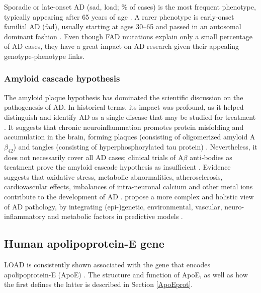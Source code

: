 \documentclass{amsart}
\begin{document}
Sporadic or late-onset AD (\acrshort{sad}, \acrshort{load}; \% of cases) is the most frequent phenotype, typically appearing after 65 years of age \cite{Beydoun2014EpidemiologicMeta-analysis}. A rarer phenotype is early-onset familial AD (\acrshort{fad}), usually starting at ages 30–65 and passed in an autosomal dominant fashion \cite{VanCauwenberghe2015ThePerspectives}.
Even though FAD mutations explain only a small percentage of AD cases, they have a great impact on AD research given their appealing genotype-phenotype links.

\subsubsection{Amyloid cascade hypothesis}
The amyloid plaque hypothesis has dominated the scientific discussion on the pathogenesis of AD. In historical terms, its impact was profound, as it helped distinguish and identify AD as a single disease that may be studied for treatment \cite{Hardy2006AlzheimersReappraisal}. It suggests that chronic neuroinflammation promotes protein misfolding and accumulation in the brain, forming plaques (consisting of oligomerized amyloid A$\beta_{42}$) and tangles (consisting of hyperphosphorylated tau protein) \cite{Edwards2019ANeurodegeneration}. Nevertheless, it does not necessarily cover all AD cases; clinical trials of A$\beta$ anti-bodies as treatment prove the amyloid cascade hypothesis as insufficient \cite{Kepp2023TheReview,Kurkinen2023TheThinking}. Evidence suggests that oxidative stress, metabolic abnormalities, atherosclerosis, cardiovascular effects, imbalances of intra-neuronal calcium and other metal ions contribute to the development of AD \cite{Kepp2023TheReview}. \citeauthor{Kepp2023TheReview} propose a more complex and holistic view of AD pathology, by integrating (epi-)genetic, environmental, vascular, neuro-inflammatory and metabolic factors in predictive models \cite{Kepp2023TheReview}.

\subsection{Human apolipoprotein-E gene}
LOAD is consistently shown associated with the gene that encodes apolipoprotein-E (ApoE) \cite{Corder1993GeneFamilies}. The structure and function of ApoE, as well as how the first defines the latter is described in Section \ref{ApoEprot}.
\end{document}
